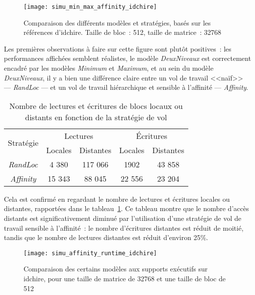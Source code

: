 \begin{figure}[h!]
  \centering
  \texttt{[image: simu\_min\_max\_affinity\_idchire]}
  \caption{Comparaison des différents modèles et stratégies, basés sur les références d'idchire. Taille de bloc~: 512, taille de matrice~: 32768}\label{fig:simu:modeles:idchire}
\end{figure}


Les premières observations à faire sur cette figure sont plutôt positives~: les performances affichées semblent réalistes, le modèle \emph{DeuxNiveaux} est correctement encadré par les modèles \emph{Minimum} et \emph{Maximum}, et au sein du modèle \emph{DeuxNiveaux}, il y a bien une différence claire entre un vol de travail <<naïf>> --- \emph{RandLoc} --- et un vol de travail hiérarchique et sensible à l'affinité --- \emph{Affinity}.

\begin{table}[h!]
\def\arraystretch{1.5}
\centering
\begin{tabular}{|c||c|c|c|c|}\hline
  \multirow{2}{*}{Stratégie} & \multicolumn{2}{c|}{Lectures} & \multicolumn{2}{c|}{Écritures} \\ \cline{2-5}
    & Locales & Distantes & Locales & Distantes \\
  \hline
  \emph{RandLoc} & 4 380 & 117 066 & 1902 & 43 858 \\
  \hline
  \emph{Affinity} & 15 343 & 88 045 & 22 556 & 23 204 \\
  \hline
\end{tabular}
\caption{Nombre de lectures et écritures de blocs locaux ou distants en fonction de la stratégie de vol}\label{tab:simu:acces-blocs-idchire}
\end{table}

Cela est confirmé en regardant le nombre de lectures et écritures locales ou distantes, rapportées dans le tableau~\ref{tab:simu:acces-blocs-idchire}.
Ce tableau montre que le nombre d'accès distants est significativement diminué par l'utilisation d'une stratégie de vol de travail sensible à l'affinité~: le nombre d'écritures distantes est réduit de moitié, tandis que le nombre de lectures distantes est réduit d'environ 25\%.


\begin{figure}[t!]
  \centering
  \texttt{[image: simu\_affinity\_runtime\_idchire]}
  \caption{Comparaison des certains modèles aux supports exécutifs sur idchire, pour une taille de matrice de 32768 et une taille de bloc de 512}\label{fig:simu:modeles-vs-runtime:idchire}
\end{figure}


